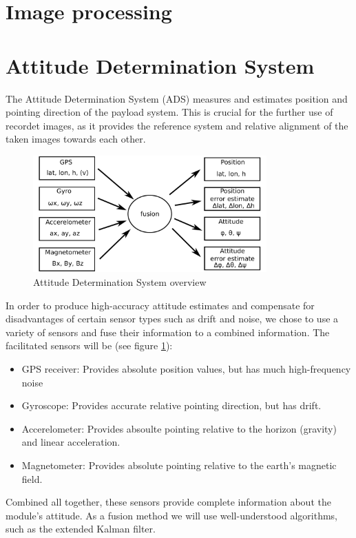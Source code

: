\FloatBarrier
\section{Image processing}


\FloatBarrier
\section{Attitude Determination System}
\label{attitude_determination}
The Attitude Determination System (ADS) measures and estimates position and pointing direction of the payload system.
This is crucial for the further use of recordet images, as it provides the reference system and relative alignment of the taken images towards each other.
\begin{figure}
\centering
\includegraphics[width=0.8\textwidth]{figures/ADS_diagram.pdf}
\caption{Attitude Determination System overview}
\label{fig:ADS_overview}
\end{figure}

In order to produce high-accuracy attitude estimates and compensate for disadvantages of certain sensor types such as drift and noise, we chose to use a variety of sensors and fuse their information to a combined information.
The facilitated sensors will be (see figure \ref{fig:ADS_overview}):
\begin{itemize}
\item GPS receiver: Provides absolute position values, but has much high-frequency noise
\item Gyroscope: Provides accurate relative pointing direction, but has drift.
\item Accerelometer: Provides absoulte pointing relative to the horizon (gravity) and linear acceleration.
\item Magnetometer: Provides absolute pointing relative to the earth's magnetic field.
\end{itemize}

Combined all together, these sensors provide complete information about the module's attitude.
As a fusion method we will use well-understood algorithms, such as the extended Kalman filter.

